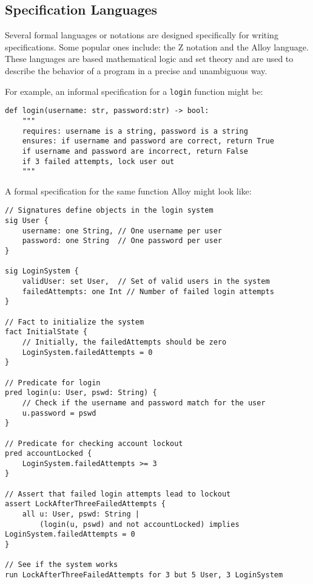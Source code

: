 \documentclass[oneside,11pt,dvipsnames]{book}
\newcommand{\code}[1]{\texttt{#1}}
\begin{document}
\subsection{Specification Languages} 

Several formal languages or notations are designed specifically for writing specifications. Some popular ones include: the Z notation and the Alloy language.  These languages are based  mathematical logic and set theory and are used to describe the behavior of a program in a precise and unambiguous way. 

For example, an informal specification for a \code{login} function might be:

\begin{lstlisting}
def login(username: str, password:str) -> bool:
    """
    requires: username is a string, password is a string
    ensures: if username and password are correct, return True
    if username and password are incorrect, return False
    if 3 failed attempts, lock user out
    """
\end{lstlisting}

A formal specification for the same function Alloy might look like:

\begin{lstlisting}[language=Alloy]
// Signatures define objects in the login system
sig User {
    username: one String, // One username per user
    password: one String  // One password per user
}

sig LoginSystem {
    validUser: set User,  // Set of valid users in the system
    failedAttempts: one Int // Number of failed login attempts
}

// Fact to initialize the system
fact InitialState {
    // Initially, the failedAttempts should be zero
    LoginSystem.failedAttempts = 0
}

// Predicate for login
pred login(u: User, pswd: String) {
    // Check if the username and password match for the user
    u.password = pswd
}

// Predicate for checking account lockout
pred accountLocked {
    LoginSystem.failedAttempts >= 3
}

// Assert that failed login attempts lead to lockout
assert LockAfterThreeFailedAttempts {
    all u: User, pswd: String | 
        (login(u, pswd) and not accountLocked) implies LoginSystem.failedAttempts = 0
}

// See if the system works
run LockAfterThreeFailedAttempts for 3 but 5 User, 3 LoginSystem    
\end{lstlisting}    
\end{document}
